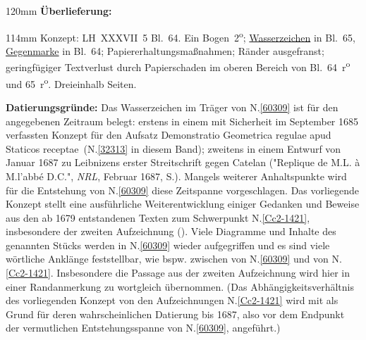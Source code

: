 \begin{ledgroupsized}[r]{120mm}
\footnotesize
\pstart
\noindent\textbf{Überlieferung:}
\pend
\end{ledgroupsized}
\begin{ledgroupsized}[r]{114mm}
\footnotesize
\pstart
\parindent -6mm
%
Konzept:
LH~XXXVII~5 Bl.~64. 
Ein Bogen~2\textsuperscript{o};
\href{\Scan{LH_37_05_065wz}}%
{Wasserzeichen} in Bl.~65,
\href{\Scan{LH_37_05_064wz}}%
{Gegenmarke} in Bl.~64;
Papiererhaltungsmaßnahmen;
Ränder ausgefranst; 
geringfügiger Textverlust durch Papierschaden im oberen Bereich von Bl.~64~r\textsuperscript{o} und 65~r\textsuperscript{o}.
Dreieinhalb Seiten.
\pend
\end{ledgroupsized}
\vspace{5mm}
\begin{ledgroup}
\footnotesize
\pstart
\noindent
\textbf{Datierungsgründe:}
Das Wasserzeichen im Träger von N.\;\ref{60309} ist für den angegebenen Zeitraum belegt:
erstens in einem mit Sicherheit im September 1685 verfassten Konzept für den Aufsatz \glqq Demonstratio Geometrica regulae apud Staticos receptae\grqq\ (N.\;\ref{32313} in diesem Band);
zweitens in einem Entwurf von Januar 1687 zu Leibnizens erster Streitschrift gegen
Catelan
(\cite{02086}"Replique de M.\;L. à M.\;l'abbé D.\;C.", \textit{NRL}, Februar 1687, S.).
Mangels weiterer Anhaltspunkte wird für die Entstehung von N.\;\ref{60309} diese Zeitspanne vorgeschlagen.
\pend
\pstart
Das vorliegende Konzept stellt eine ausführliche Weiterentwicklung einiger Gedanken und Beweise aus den ab 1679 entstandenen Texten zum Schwerpunkt N.\;\ref{Cc2-1421}, insbesondere der zweiten Aufzeichnung ().
Viele Diagramme und Inhalte des genannten Stücks werden in N.\;\ref{60309} wieder aufgegriffen und es sind viele wörtliche Anklänge feststellbar, wie bspw. zwischen  von N.\;\ref{60309} und  von N.\;\ref{Cc2-1421}.
Insbesondere die Passage  aus der zweiten Aufzeichnung wird hier in einer Randanmerkung zu  wortgleich übernommen.
(Das Abhängigkeitsverhältnis des vorliegenden Konzept von den Aufzeichnungen N.\;\ref{Cc2-1421} wird mit als Grund für deren wahrscheinlichen Datierung bis 1687, also vor dem Endpunkt der vermutlichen Entstehungsspanne von N.\;\ref{60309}, angeführt.)
\pend 
\end{ledgroup}

